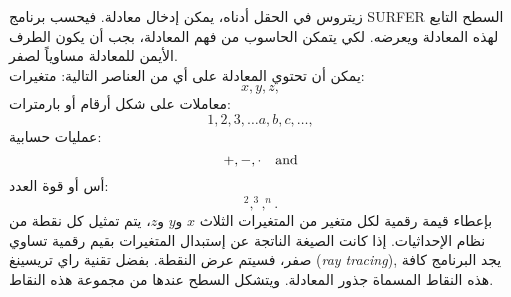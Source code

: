 \begin{surferPage}[زيتروس]{زيتروس}
في الحقل أدناه، يمكن إدخال معادلة. فيحسب برنامج \textenglish{SURFER} السطح التابع لهذه المعادلة ويعرضه. لكي يتمكن الحاسوب من فهم المعادلة، بجب أن يكون الطرف الأيمن للمعادلة مساوياً لصفر.
\\
يمكن أن تحتوي المعادلة على أي من العناصر التالية:
\newline
متغيرات:
\[x, y, z, \]
معاملات على شكل أرقام أو بارمترات:
\[1, 2, 3, \dots a, b, c, \dots, \]
عمليات حسابية:
\[+,  - , \cdot \quad \textnormal{and} \]
أس أو قوة العدد:
\[ ^2, ^3, ^n .\]
بإعطاء قيمة رقمية لكل متغير من المتغيرات الثلاث $x$ و$y$ و$z$، يتم تمثيل كل نقطة من نظام الإحداثيات. إذا كانت الصيغة الناتجة عن إستبدال المتغيرات بقيم رقمية تساوي صفر، فسيتم عرض النقطة. بفضل تقنية راي تريسينغ
\textenglish{(\textit{ray tracing})},
يجد البرنامج كافة هذه النقاط المسماة جذور المعادلة. ويتشكل السطح عندها من مجموعة هذه النقاط.
\end{surferPage}
